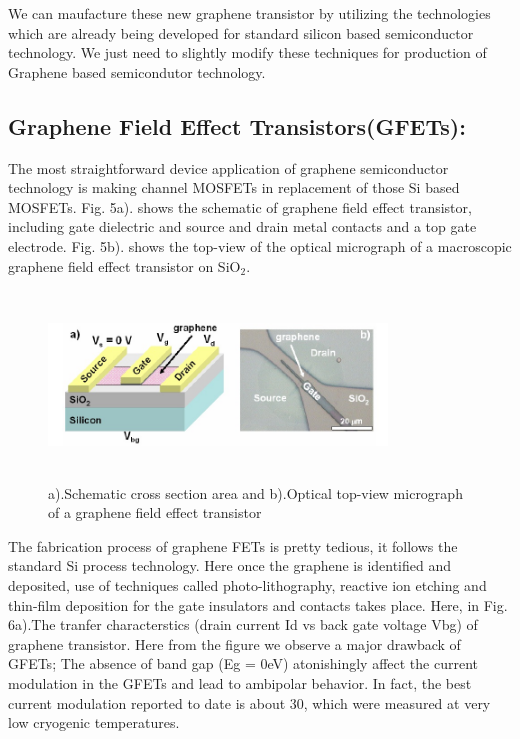 \documentclass[conference]{IEEEtran}
\begin{document}
We can maufacture these new graphene transistor by utilizing the technologies which are already being developed for standard silicon based semiconductor technology. We just need to slightly modify these techniques for production of Graphene based semicondutor technology.
\\

\subsection{\textbf{Graphene Field Effect Transistors(GFETs):}}
The most straightforward device application of graphene semiconductor technology is making channel MOSFETs in replacement of those Si based MOSFETs. Fig. 5a). shows the schematic of graphene field effect transistor, including gate dielectric and source and drain metal contacts and a top gate electrode. Fig. 5b). shows the top-view of the optical micrograph of a macroscopic graphene field effect transistor on SiO$_2$.

\begin{figure}[h]
\centering
\includegraphics[width=9cm, height=5cm]{4.jpg}
\caption{a).Schematic cross section area and b).Optical top-view micrograph of a graphene field effect transistor}
\end{figure}

The fabrication process of graphene FETs is pretty tedious, it follows the standard Si process technology. Here once the graphene is identified and deposited, use of techniques called photo-lithography, reactive ion etching and thin-film deposition for the gate insulators and contacts takes place. Here, in Fig. 6a).The tranfer characterstics (drain current Id vs back gate voltage Vbg) of graphene transistor. Here from the figure we observe a major drawback of GFETs; The absence of band gap (Eg = 0eV) atonishingly affect the current modulation in the GFETs and lead to ambipolar behavior. In fact, the best current modulation reported to date is about 30, which were measured at very low cryogenic temperatures. 
\end{document}
